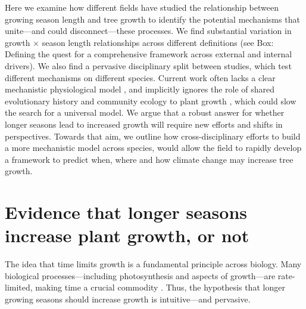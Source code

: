 \documentclass[11pt]{article}
\newcommand{\R}[1]{\label{#1}\linelabel{#1}}
\begin{document}
Here we examine how different fields have studied the relationship between growing season length and tree growth to identify the potential mechanisms that unite---and could disconnect---these processes. %
We find substantial variation in growth $\times$ season length relationships across different definitions (see Box: Defining the quest for a comprehensive framework across external and internal drivers). We also find a pervasive disciplinary split between studies, which test different mechanisms on different species. \R{fornccS}Current work often lacks a clear mechanistic physiological model \citep{korner2015paradigm,fatichi2019modelling}, and implicitly ignores the role of shared evolutionary history and community ecology to plant growth \citep[e.g.][]{Grime:1977sw,Webb:2002or,avila2023evidence}, which could slow the search for a universal model. We argue that a robust answer for whether longer seasons lead to increased growth will require new efforts and shifts in perspectives. Towards that aim, we outline how cross-disciplinary efforts to build a more mechanistic model across species, would allow the field to rapidly develop a framework to predict when, where and how climate change may increase tree growth.\R{fornccE} %

\section*{Evidence that longer seasons increase plant growth, or not} %
The idea that time limits growth is a fundamental principle across biology. Many biological processes---including photosynthesis and aspects of growth---are rate-limited, making time a crucial commodity \citep{nobel1983biophysical,cosgrove2005growth,hilty2021plant}. Thus, the hypothesis that longer growing seasons should increase growth is intuitive---and pervasive. 
\end{document}

